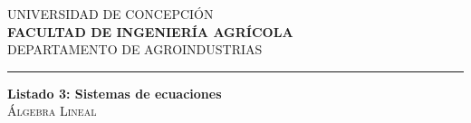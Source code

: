 \documentclass[11pt]{article}
\begin{document}
\noindent

UNIVERSIDAD DE CONCEPCI\'ON
\\
\textbf{\small FACULTAD DE INGENIER\'IA AGR\'ICOLA}
\\
DEPARTAMENTO DE AGROINDUSTRIAS\\
\rule{16cm}{.5pt}
% 

\vspace{0.5cm}

\begin{center}
  \textbf{Listado 3: Sistemas de ecuaciones}
  \\
  \textsc{\'Algebra Lineal}
\end{center}

\end{document}
